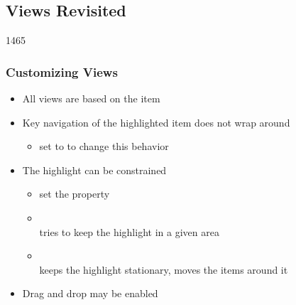 %
%
%
%

\subsection{Views Revisited}

\begin{slide}{1465}\frametitle{Customizing Views}

\begin{itemize}
\item All views are based on the  item
\item Key navigation of the highlighted item does not wrap around
  \begin{itemize}
  \item set  to  to change this behavior
  \end{itemize}
\item The highlight can be constrained
  \begin{itemize}
  \item set the  property
  \item {}\\
        tries to keep the highlight in a given area
  \item {}\\
        keeps the highlight stationary, moves the items around it
  \end{itemize}
\item Drag and drop may be enabled
\end{itemize}

\end{slide}



